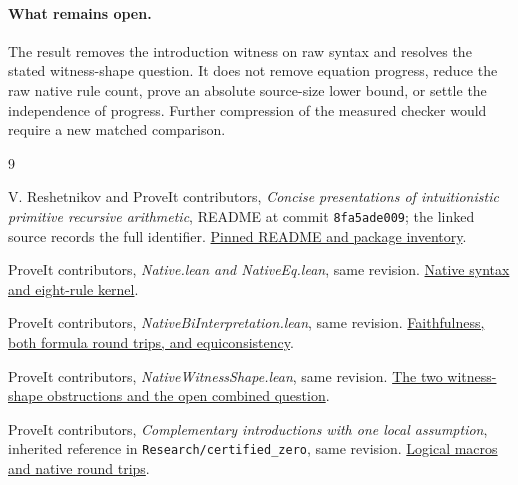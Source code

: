 \documentclass[11pt]{article}
\theoremstyle{definition}
\theoremstyle{remark}
\begin{document}
\paragraph{What remains open.}
The result removes the introduction witness on raw syntax and resolves
the stated witness-shape question. It does not remove equation progress,
reduce the raw native rule count, prove an absolute source-size lower
bound, or settle the independence of progress. Further compression of
the measured checker would require a new matched comparison.

\appendix



\begin{thebibliography}{9}
\raggedright
{}
V. Reshetnikov and ProveIt contributors,
\emph{Concise presentations of intuitionistic primitive recursive arithmetic},
README at commit \texttt{8fa5ade009}; the linked source records the full identifier.
\href{https://github.com/VladimirReshetnikov/ProveIt/blob/8fa5ade009b5cceba7b68f07b6a834fe77cf10c1/Logic/PrimitiveRecursiveArithmetic/ConciseIPRA/README.md}{Pinned README and package inventory}.

ProveIt contributors, \emph{Native.lean and NativeEq.lean}, same revision.
\href{https://github.com/VladimirReshetnikov/ProveIt/blob/8fa5ade009b5cceba7b68f07b6a834fe77cf10c1/Logic/PrimitiveRecursiveArithmetic/ConciseIPRA/Lean/ConciseIPRA/Native.lean}{Native syntax and eight-rule kernel}.

ProveIt contributors, \emph{NativeBiInterpretation.lean}, same revision.
\href{https://github.com/VladimirReshetnikov/ProveIt/blob/8fa5ade009b5cceba7b68f07b6a834fe77cf10c1/Logic/PrimitiveRecursiveArithmetic/ConciseIPRA/Lean/ConciseIPRA/NativeBiInterpretation.lean}{Faithfulness, both formula round trips, and equiconsistency}.

ProveIt contributors, \emph{NativeWitnessShape.lean}, same revision.
\href{https://github.com/VladimirReshetnikov/ProveIt/blob/8fa5ade009b5cceba7b68f07b6a834fe77cf10c1/Logic/PrimitiveRecursiveArithmetic/ConciseIPRA/Lean/ConciseIPRA/NativeWitnessShape.lean}{The two witness-shape obstructions and the open combined question}.

ProveIt contributors, \emph{Complementary introductions with one local
assumption}, inherited reference in \texttt{Research/certified\_zero},
same revision.
\href{https://github.com/VladimirReshetnikov/ProveIt/blob/8fa5ade009b5cceba7b68f07b6a834fe77cf10c1/Logic/PrimitiveRecursiveArithmetic/ConciseIPRA/Research/certified_zero/reference/inherited_choice_basis.tex}{Logical macros and native round trips}.


\end{thebibliography}
\end{document}
